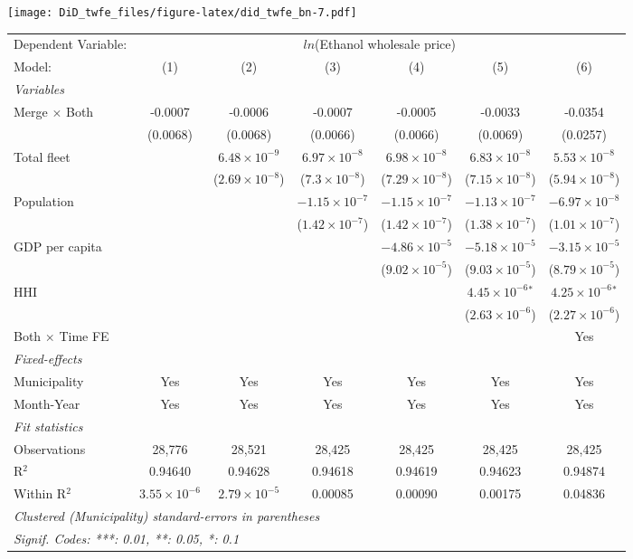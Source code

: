 \documentclass[
]{article}
\begin{document}
\texttt{[image: DiD\_twfe\_files/figure-latex/did\_twfe\_bn-7.pdf]}

\begin{tabular}{lcccccc}
\tabularnewline\midrule\midrule
Dependent Variable:&\multicolumn{6}{c}{$ln$(Ethanol wholesale price)}\\
Model:&(1) & (2) & (3) & (4) & (5) & (6)\\
\midrule \emph{Variables}&   &   &   &   &   &  \\
Merge $\times $ Both & -0.0007 & -0.0006 & -0.0007 & -0.0005 & -0.0033 & -0.0354\\
  &(0.0068) & (0.0068) & (0.0066) & (0.0066) & (0.0069) & (0.0257)\\
Total fleet &    & $6.48\times 10^{-9}$ & $6.97\times 10^{-8}$ & $6.98\times 10^{-8}$ & $6.83\times 10^{-8}$ & $5.53\times 10^{-8}$\\
  &   & ($2.69\times 10^{-8}$) & ($7.3\times 10^{-8}$) & ($7.29\times 10^{-8}$) & ($7.15\times 10^{-8}$) & ($5.94\times 10^{-8}$)\\
Population &    &    & $-1.15\times 10^{-7}$ & $-1.15\times 10^{-7}$ & $-1.13\times 10^{-7}$ & $-6.97\times 10^{-8}$\\
  &   &    & ($1.42\times 10^{-7}$) & ($1.42\times 10^{-7}$) & ($1.38\times 10^{-7}$) & ($1.01\times 10^{-7}$)\\
GDP per capita &    &    &    & $-4.86\times 10^{-5}$ & $-5.18\times 10^{-5}$ & $-3.15\times 10^{-5}$\\
  &   &    &    & ($9.02\times 10^{-5}$) & ($9.03\times 10^{-5}$) & ($8.79\times 10^{-5}$)\\
HHI &    &    &    &    & $4.45\times 10^{-6}$$^{*}$ & $4.25\times 10^{-6}$$^{*}$\\
  &   &    &    &    & ($2.63\times 10^{-6}$) & ($2.27\times 10^{-6}$)\\
Both $\times$ Time FE &  &  &  &  &  & Yes\\
\midrule \emph{Fixed-effects}&   &   &   &   &   &  \\
Municipality & Yes & Yes & Yes & Yes & Yes & Yes\\
Month-Year & Yes & Yes & Yes & Yes & Yes & Yes\\
\midrule \emph{Fit statistics}&  & & & & & \\
Observations & 28,776&28,521&28,425&28,425&28,425&28,425\\
R$^2$ & 0.94640&0.94628&0.94618&0.94619&0.94623&0.94874\\
Within R$^2$ & $3.55\times 10^{-6}$&$2.79\times 10^{-5}$&0.00085&0.00090&0.00175&0.04836\\
\midrule\midrule\multicolumn{7}{l}{\emph{Clustered (Municipality) standard-errors in parentheses}}\\
\multicolumn{7}{l}{\emph{Signif. Codes: ***: 0.01, **: 0.05, *: 0.1}}\\
\end{tabular}
\end{document}

